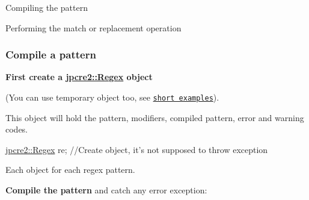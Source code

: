 \begin{DoxyEnumerate}
\item Compiling the pattern
\item Performing the match or replacement operation
\end{DoxyEnumerate}\hypertarget{index_compile-a-pattern}{}\subsubsection{Compile a pattern}\label{index_compile-a-pattern}
{\bfseries First create a {\ttfamily \hyperlink{classjpcre2_1_1Regex}{jpcre2\+::\+Regex}} object}

(You can use temporary object too, see \href{#short-examples}{\tt short examples}).

This object will hold the pattern, modifiers, compiled pattern, error and warning codes.


\begin{DoxyCode}
\hyperlink{classjpcre2_1_1Regex}{jpcre2::Regex} re;   \textcolor{comment}{//Create object, it's not supposed to throw exception}
\end{DoxyCode}
 Each object for each regex pattern.

{\bfseries Compile the pattern} and catch any error exception\+:


